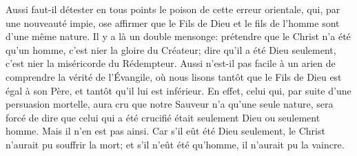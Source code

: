 Aussi faut-il détester en tous points le poison de cette erreur orientale,
	qui, par une nouveauté impie,
	ose affirmer que le Fils de Dieu et le fils de l’homme
		sont d’une même nature.
Il y a là un double mensonge:
	prétendre que le Christ n’a été qu’un homme,
	c’est nier la gloire du Créateur;
	dire qu’il a été Dieu seulement,
	c’est nier la miséricorde du Rédempteur.
Aussi n’est-il pas facile à un arien de comprendre la vérité de l’Évangile,
	où nous lisons tantôt que le Fils de Dieu est égal à son Père,
	et tantôt qu’il lui est inférieur.
En effet, celui qui, par suite d’une persuasion mortelle,
	aura cru que notre Sauveur n’a qu’une seule nature,
	sera forcé de dire que celui qui a été crucifié
		était seulement Dieu ou seulement homme.
	Mais il n’en est pas ainsi.
Car s’il eût été Dieu seulement, le Christ n’aurait pu souffrir la mort;
	et s’il n’eût été qu’homme, il n’aurait pu la vaincre.
